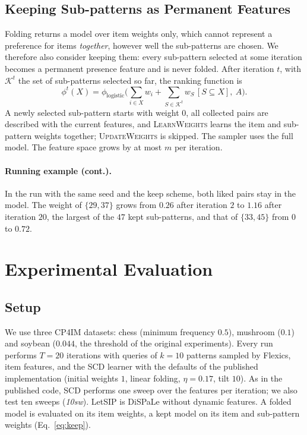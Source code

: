 \documentclass[sigconf]{acmart}
\begin{document}
\subsection{Keeping Sub-patterns as Permanent Features}
\label{subsec:keep}
Folding returns a model over item weights only, which cannot represent a preference for items \emph{together}, however well the sub-patterns are chosen. We therefore also consider keeping them: every sub-pattern selected at some iteration becomes a permanent presence feature and is never folded. After iteration $t$, with $\mathcal K^t$ the set of sub-patterns selected so far, the ranking function is
\begin{equation}\label{eq:keep}
 \phi^t(X)=\phi_{\mathrm{logistic}}\Big(\sum_{i\in X}w_i+\sum_{S\in\mathcal K^t}w_S\,[S\subseteq X],\ A\Big).
\end{equation}
A newly selected sub-pattern starts with weight $0$, all collected pairs are described with the current features, and \textsc{LearnWeights} learns the item and sub-pattern weights together; \textsc{UpdateWeights} is skipped. The sampler uses the full model. The feature space grows by at most $m$ per iteration.

\paragraph{Running example (cont.).}
In the run with the same seed and the keep scheme, both liked pairs stay in the model. The weight of $\{29,37\}$ grows from $0.26$ after iteration $2$ to $1.16$ after iteration $20$, the largest of the $47$ kept sub-patterns, and that of $\{33,45\}$ from $0$ to $0.72$.

\section{Experimental Evaluation}

\subsection{Setup}

We use three CP4IM datasets: chess (minimum frequency $0.5$), mushroom ($0.1$) and soybean ($0.044$, the threshold of the original experiments). 
Every run performs $T = 20$ iterations with queries of $k = 10$ patterns sampled by Flexics, item features, and the SCD learner with the defaults of the published implementation (initial weights $1$, linear folding, $\eta = 0.17$, tilt $10$). As in the published code, SCD performs one sweep over the features per iteration; we also test ten sweeps (\emph{10sw}). LetSIP is DiSPaLe without dynamic features. A folded model is evaluated on its item weights, a kept model on its item and sub-pattern weights (Eq.~\eqref{eq:keep}).
\end{document}
